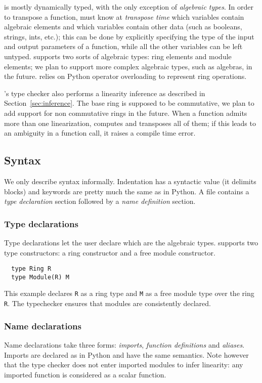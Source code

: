 \tALpy{} is mostly dynamically typed, with the only exception of
\emph{algebraic types}. In order to transpose a function, \tALpy{}
must know at \emph{transpose time} which variables contain algebraic
elements and which variables contain other data (such as booleans,
strings, ints, etc.); this can be done by explicitly specifying the
type of the input and output parameters of a function, while all the
other variables can be left untyped. \tALpy{} supports two sorts of
algebraic types: ring elements and module elements; we plan to support
more complex algebraic types, such as algebras, in the
future. \tALpy{} relies on Python operator overloading to represent
ring operations.

\tALpy{}'s type checker also performs a linearity inference as
described in Section~\ref{sec:inference}. The base ring is supposed to
be commutative, we plan to add support for non commutative rings in
the future. When a function admits more than one linearization,
\tALpy{} computes and transposes all of them; if this leads to an
ambiguity in a function call, it raises a compile time error.


\subsection{Syntax}
\label{sec:syntax}
We only describe \tALpy{} syntax informally. Indentation has a
syntactic value (it delimits blocks) and keywords are pretty much the
same as in Python. A \tALpy{} file contains a \emph{type declaration}
section followed by a \emph{name definition} section.

\subsubsection{Type declarations}
 Type declarations let the user declare which
are the algebraic types.  \tALpy{} supports two type constructors: a
ring constructor and a free module constructor.

\begin{lstlisting}
  type Ring R
  type Module(R) M
\end{lstlisting}

This example declares \lstinline+R+ as a ring type and \lstinline+M+
as a free module type over the ring \lstinline+R+. The typechecker
ensures that modules are consistently declared.


\subsubsection{Name declarations}
Name declarations take three forms: \emph{imports}, \emph{function
  definitions} and \emph{aliases}. Imports are declared as in Python
and have the same semantics. Note however that the type checker does
not enter imported modules to infer linearity: any imported function
is considered as a scalar function.


